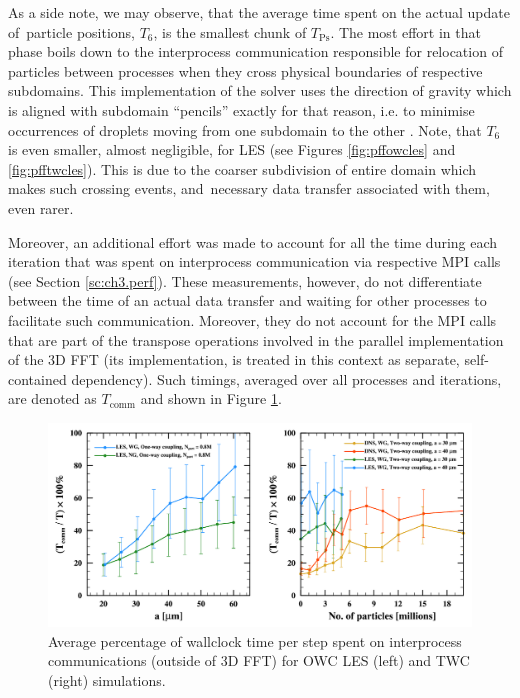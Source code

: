 \documentclass{pracamgren}
\begin{document}
As a side note, we may observe, that the average time spent on the actual update of~particle positions, $T_6$, is the smallest chunk of $T_{\text{Ps}}$.
The most effort in that phase boils down to the interprocess communication responsible for relocation of particles between processes when they cross physical boundaries of respective subdomains.
This implementation of the solver uses the direction of gravity which is aligned with subdomain ``pencils'' exactly for that reason, i.e. to minimise occurrences of droplets moving from one subdomain to the other \parencite{Ayala2014}.
Note, that $T_6$ is even smaller, almost negligible, for LES (see Figures \ref{fig:pffowcles} and \ref{fig:pfftwcles}).
This is due to the coarser subdivision of entire domain which makes such crossing events, and~necessary data transfer associated with them, even rarer.

\medskip

Moreover, an additional effort was made to account for all the time during each iteration that was spent on interprocess communication via respective MPI calls (see Section \ref{sc:ch3.perf}).
These measurements, however, do not differentiate between the time of an actual data transfer and waiting for other processes to facilitate such communication.
Moreover, they do not account for the MPI calls that are part of the transpose operations involved in the parallel implementation of the 3D FFT (its implementation, is treated in this context as separate, self-contained dependency).
Such timings, averaged over all processes and iterations, are denoted as $T_{\text{comm}}$ and shown in Figure \ref{fig:pffcomm}.

\begin{figure}[h]
\centering
\includegraphics[width=13.5cm]{img/plots/3-3g-pffcomm.pdf}
\caption{
Average percentage of wallclock time per step spent on interprocess communications (outside of 3D FFT) for OWC LES (left) and TWC (right) simulations.
}
\label{fig:pffcomm}
\end{figure}
\end{document}
